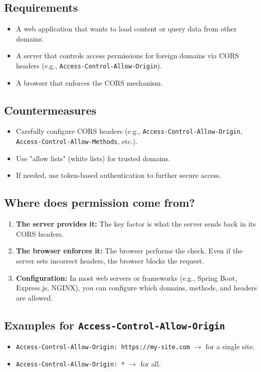 \subsection*{Requirements}
\begin{itemize}
    \item A web application that wants to load content or query data from other domains.
    \item A server that controls access permissions for foreign domains via CORS headers (e.g., \texttt{Access-Control-Allow-Origin}).
    \item A browser that enforces the CORS mechanism.
\end{itemize}

\subsection*{Countermeasures}
\begin{itemize}
    \item Carefully configure CORS headers (e.g., \texttt{Access-Control-Allow-Origin}, \texttt{Access-Control-Allow-Methods}, etc.).
    \item Use "allow lists" (white lists) for trusted domains.
    \item If needed, use token-based authentication to further secure access.
\end{itemize}

\subsection*{Where does permission come from?}
\begin{enumerate}
    \item \textbf{The server provides it:} The key factor is what the server sends back in its CORS headers.
    \item \textbf{The browser enforces it:} The browser performs the check. Even if the server sets incorrect headers, the browser blocks the request.
    \item \textbf{Configuration:} In most web servers or frameworks (e.g., Spring Boot, Express.js, NGINX), you can configure which domains, methods, and headers are allowed.
\end{enumerate}

\subsection*{Examples for \texttt{Access-Control-Allow-Origin}}
\begin{itemize}
    \item \texttt{Access-Control-Allow-Origin: https://my-site.com} $\rightarrow$ for a single site.
    \item \texttt{Access-Control-Allow-Origin: *} $\rightarrow$ for all.
\end{itemize}

